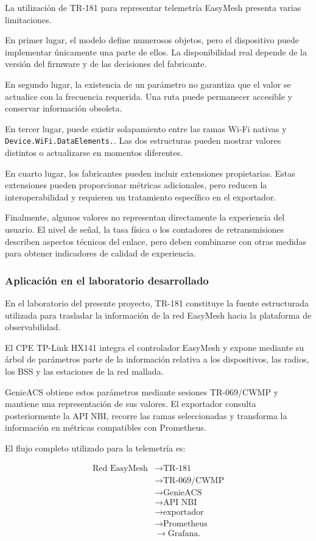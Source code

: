 La utilización de TR-181 para representar telemetría EasyMesh presenta
varias limitaciones.

En primer lugar, el modelo define numerosos objetos, pero el dispositivo
puede implementar únicamente una parte de ellos. La disponibilidad real
depende de la versión del firmware y de las decisiones del fabricante.

En segundo lugar, la existencia de un parámetro no garantiza que el valor
se actualice con la frecuencia requerida. Una ruta puede permanecer
accesible y conservar información obsoleta.

En tercer lugar, puede existir solapamiento entre las ramas Wi-Fi nativas
y \texttt{Device.WiFi.DataElements.}. Las dos estructuras pueden mostrar
valores distintos o actualizarse en momentos diferentes.

En cuarto lugar, los fabricantes pueden incluir extensiones propietarias.
Estas extensiones pueden proporcionar métricas adicionales, pero reducen
la interoperabilidad y requieren un tratamiento específico en el
exportador.

Finalmente, algunos valores no representan directamente la experiencia
del usuario. El nivel de señal, la tasa física o los contadores de
retransmisiones describen aspectos técnicos del enlace, pero deben
combinarse con otras medidas para obtener indicadores de calidad de
experiencia.


\subsubsection*{Aplicación en el laboratorio desarrollado}

En el laboratorio del presente proyecto, TR-181 constituye la fuente
estructurada utilizada para trasladar la información de la red EasyMesh
hacia la plataforma de observabilidad.

El CPE TP-Link HX141 integra el controlador EasyMesh y expone mediante su
árbol de parámetros parte de la información relativa a los dispositivos,
las radios, los BSS y las estaciones de la red mallada.

GenieACS obtiene estos parámetros mediante sesiones TR-069/CWMP y
mantiene una representación de sus valores. El exportador consulta
posteriormente la API NBI, recorre las ramas seleccionadas y transforma
la información en métricas compatibles con Prometheus.

El flujo completo utilizado para la telemetría es:

\[
\begin{aligned}
    \text{Red EasyMesh}
    &\longrightarrow
    \text{TR-181}\\
    &\longrightarrow
    \text{TR-069/CWMP}\\
    &\longrightarrow
    \text{GenieACS}\\
    &\longrightarrow
    \text{API NBI}\\
    &\longrightarrow
    \text{exportador}\\
    &\longrightarrow
    \text{Prometheus}\\
    &\longrightarrow
    \text{Grafana}.
\end{aligned}
\]

